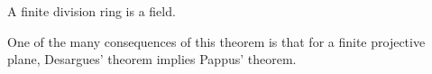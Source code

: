 \documentclass[12pt]{article}
\begin{document}

A finite division ring is a field.

One of the many consequences of this theorem
is that for a finite projective plane,
Desargues' theorem implies Pappus' theorem.
\end{document}
